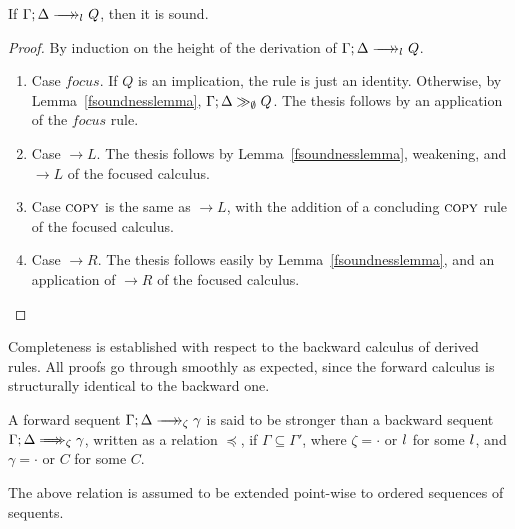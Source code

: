 \begin{theorem}[Soundness]
  If $\zfneuseq{\Gamma}{\Delta}{\reactlist{}}{Q}$, then it is sound.
\end{theorem}
\begin{proof}
  By induction on the height of the derivation of
  $\zfneuseq{\Gamma}{\Delta}{\reactlist{}}{Q}$.

  \begin{enumerate}
  \item Case $focus$.
    If $Q$ is an implication, the rule is just an identity. Otherwise, by
    Lemma~\ref{fsoundnesslemma}, $\Gamma; \Delta \gg_{\emptyset} Q$. The thesis
    follows by an application of the $focus$ rule.

  \item Case $\rightarrow L$.
    The thesis follows by Lemma~\ref{fsoundnesslemma}, weakening, and
    $\rightarrow L$ of the focused calculus.

  \item Case $\textsc{copy}$ is the same as $\rightarrow L$, with the addition of a
    concluding $\textsc{copy}$ rule of the focused calculus.

  \item Case $\rightarrow R$.
    The thesis follows easily by Lemma~\ref{fsoundnesslemma}, and an application
    of $\rightarrow R$ of the focused calculus.

  \end{enumerate}
\end{proof}

Completeness is established with respect to the backward calculus of derived
rules. All proofs go through smoothly as expected, since the forward calculus is
structurally identical to the backward one.

\begin{definition}
  A forward sequent $\zfneuseq{\Gamma}{\Delta}{\zeta}{\gamma}$ is said to be
  stronger than a backward sequent
  $\zbneuseq{\Gamma}{\Delta}{\zeta}{\gamma}$, written as a relation
  $\preceq$, if $\Gamma \subseteq \Gamma'$, where $\zeta = \cdot$ or
  $l_{}$ for some $l_{}$, and $\gamma = \cdot$ or $C$ for some $C$.
\end{definition}

The above relation is assumed to be extended point-wise to ordered sequences of
sequents.

